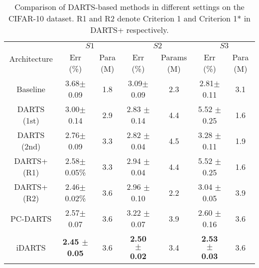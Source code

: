 \documentclass[journal]{IEEEtran}
\begin{document}
\begin{table*}[!htpb]
\begin{center}
\caption{Comparison of DARTS-based methods in different settings on the CIFAR-10 dataset. R1 and R2 denote Criterion 1 and Criterion 1* in DARTS+ respectively.} 
{
\begin{tabular}{c|c|c|c|c|c|c}
\hline
\hline
\multirow{2}{*}{Architecture} & \multicolumn{2}{c|}{$S1$} & \multicolumn{2}{c}{$S2$} & \multicolumn{2}{c}{$S3$}\\
\cline{2-7}
& Err (\%) & Para (M) &  Err (\%) & Params (M) &  Err (\%) & Para (M)\\
\hline
Baseline & 3.68$\pm$0.09 & 1.8 & 3.09$\pm$0.09 &2.3&  2.81$\pm$0.11 & 3.1 \\
\hline
DARTS (1st) & 3.00$\pm$0.14 & 2.9 & 2.83 $\pm$ 0.14 & 4.4 & 5.52 $\pm$ 0.25 & 1.6\\
DARTS (2nd)& 2.76$\pm$0.09 & 3.3 & 2.82 $\pm$ 0.04 & 4.5 & 3.28 $\pm$ 0.11 & 1.9\\
DARTS+ (R1)& 2.58$\pm$0.05\% & 3.3 & 2.94 $\pm$ 0.04& 4.4 & 5.52 $\pm$ 0.25 & 1.6\\
DARTS+ (R2)& 2.46$\pm$0.02\% & 3.6 & 2.96 $\pm$ 0.10 & 2.2 & 3.04 $\pm$ 0.05 & 3.9\\
PC-DARTS & 2.57$\pm$0.07 & 3.6 & 3.22 $\pm$ 0.07 & 3.9 & 2.60 $\pm$ 0.16 & 3.6\\
\hline
iDARTS & \textbf{2.45 $\pm$0.05} & 3.6 & \textbf{2.50 $\pm$ 0.02} & 3.4 & \textbf{2.53 $\pm$ 0.03} & 3.6\\
\hline
\hline
\end{tabular}}
\label{T.Search}
\end{center}
\end{table*}
\end{document}
